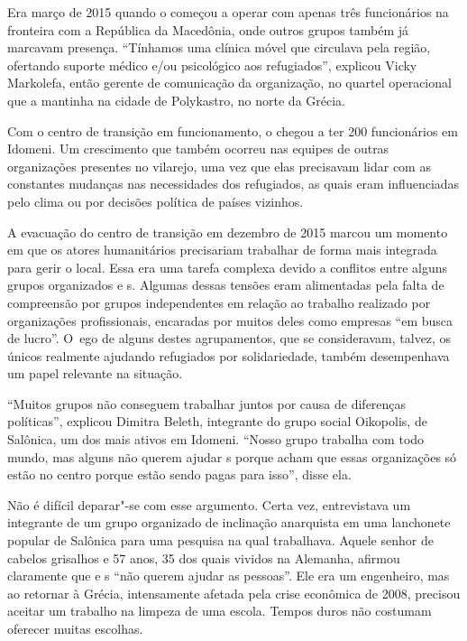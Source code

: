 \clearpage

 

Era março de 2015 quando o  começou a operar com apenas três funcionários na fronteira
com a República da Macedônia, onde outros grupos também já
marcavam  presença. ``Tínhamos uma clínica móvel que circulava pela
região, ofertando suporte médico e/ou psicológico aos refugiados'',
explicou Vicky Markolefa, então gerente de comunicação da organização,
no quartel operacional que a  mantinha na cidade de Polykastro, no
norte da Grécia.

Com o centro de transição em funcionamento, o  chegou a ter 200
funcionários em Idomeni. Um crescimento que também ocorreu nas equipes
de outras organizações presentes no vilarejo, uma vez que elas
precisavam lidar com as constantes mudanças nas necessidades dos
refugiados, as quais eram influenciadas pelo clima ou por decisões
política de países vizinhos.

A evacuação do centro de transição em dezembro de 2015 marcou um momento
em que os atores humanitários precisariam trabalhar de forma mais
integrada para gerir o local. Essa era uma tarefa complexa devido a
conflitos entre alguns grupos organizados e s. Algumas dessas tensões
eram alimentadas pela falta de compreensão por grupos independentes em
relação ao trabalho realizado por organizações profissionais, encaradas
por muitos deles como empresas ``em busca de lucro''. O~ego de alguns
destes agrupamentos, que se consideravam, talvez, os únicos realmente
ajudando refugiados por solidariedade, também desempenhava um papel
relevante na situação.

``Muitos grupos não conseguem trabalhar juntos por causa de diferenças
políticas'', explicou Dimitra Beleth, integrante do grupo social
Oikopolis, de Salônica, um dos mais ativos em Idomeni. ``Nosso grupo
trabalha com todo mundo, mas alguns não querem ajudar s porque acham
que essas organizações só estão no centro porque estão sendo pagas para
isso'', disse ela.

Não é difícil deparar"-se com esse argumento. Certa vez, entrevistava um
integrante de um grupo organizado de inclinação anarquista em uma
lanchonete popular de Salônica para uma pesquisa na qual trabalhava.
Aquele senhor de cabelos grisalhos e 57 anos, 35 dos quais vividos na
Alemanha, afirmou claramente que  e s ``não querem ajudar as
pessoas''. Ele era um engenheiro, mas ao retornar à Grécia, intensamente
afetada pela crise econômica de 2008, precisou aceitar um trabalho na
limpeza de uma escola. Tempos duros não costumam oferecer muitas
escolhas.

